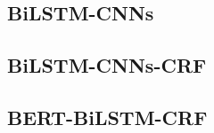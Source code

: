 \documentclass[a4paper,UTF8,no-math]{ctexart}
\begin{document}
	\citep{bilstm-crf}
	
	\subsection{BiLSTM-CNNs}
	
	\citep{chiu2016named}
	
	\subsection{BiLSTM-CNNs-CRF}
	
	\citep{ma2016end}

	\subsection{BERT-BiLSTM-CRF}
	
	\citep{devlin2018bert}
	
	\newpage
	
    
\end{document}
